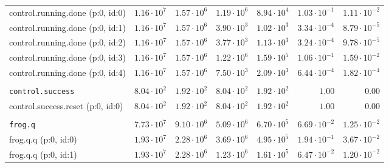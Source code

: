 \begin{table}[htbp]
{\begin{tabular}{lrrrrrr}
\hspace{3mm}control.running.done (p:0, id:0)  & $1.16 \cdot 10^{7}$ & $1.57 \cdot 10^{6}$ & $1.19 \cdot 10^{6}$ & $8.94 \cdot 10^{4}$ & $1.03 \cdot 10^{-1}$ & $1.11 \cdot 10^{-2}$ \\
\hspace{3mm}control.running.done (p:0, id:1)  & $1.16 \cdot 10^{7}$ & $1.57 \cdot 10^{6}$ & $3.90 \cdot 10^{3}$ & $1.02 \cdot 10^{3}$ & $3.34 \cdot 10^{-4}$ & $8.79 \cdot 10^{-5}$ \\
\hspace{3mm}control.running.done (p:0, id:2)  & $1.16 \cdot 10^{7}$ & $1.57 \cdot 10^{6}$ & $3.77 \cdot 10^{3}$ & $1.13 \cdot 10^{3}$ & $3.24 \cdot 10^{-4}$ & $9.78 \cdot 10^{-5}$ \\
\hspace{3mm}control.running.done (p:0, id:3)  & $1.16 \cdot 10^{7}$ & $1.57 \cdot 10^{6}$ & $1.22 \cdot 10^{6}$ & $1.59 \cdot 10^{5}$ & $1.06 \cdot 10^{-1}$ & $1.59 \cdot 10^{-2}$ \\
\hspace{3mm}control.running.done (p:0, id:4)  & $1.16 \cdot 10^{7}$ & $1.57 \cdot 10^{6}$ & $7.50 \cdot 10^{3}$ & $2.09 \cdot 10^{3}$ & $6.44 \cdot 10^{-4}$ & $1.82 \cdot 10^{-4}$ \\
\\[-8pt]\texttt{control.success}              & $8.04 \cdot 10^{2}$ & $1.92 \cdot 10^{2}$ & $8.04 \cdot 10^{2}$ & $1.92 \cdot 10^{2}$ &               $1.00$ &               $0.00$ \\
\hspace{3mm}control.success.reset (p:0, id:0) & $8.04 \cdot 10^{2}$ & $1.92 \cdot 10^{2}$ & $8.04 \cdot 10^{2}$ & $1.92 \cdot 10^{2}$ &               $1.00$ &               $0.00$ \\
\\[-8pt]\texttt{frog.q}                       & $7.73 \cdot 10^{7}$ & $9.10 \cdot 10^{6}$ & $5.09 \cdot 10^{6}$ & $6.70 \cdot 10^{5}$ & $6.69 \cdot 10^{-2}$ & $1.25 \cdot 10^{-2}$ \\
\hspace{3mm}frog.q.q (p:0, id:0)              & $1.93 \cdot 10^{7}$ & $2.28 \cdot 10^{6}$ & $3.69 \cdot 10^{6}$ & $4.95 \cdot 10^{5}$ & $1.94 \cdot 10^{-1}$ & $3.67 \cdot 10^{-2}$ \\
\hspace{3mm}frog.q.q (p:0, id:1)              & $1.93 \cdot 10^{7}$ & $2.28 \cdot 10^{6}$ & $1.23 \cdot 10^{6}$ & $1.61 \cdot 10^{5}$ & $6.47 \cdot 10^{-2}$ & $1.20 \cdot 10^{-2}$ \\

\end{tabular}}
\end{table}
